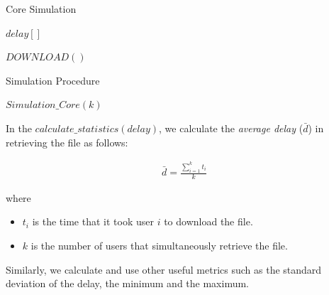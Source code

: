 {{{\begin{algorithm}
\caption{Core Simulation}\label{alg:simulation}
\begin{algorithmic}[1]

    \State $delay[]$
    \EndFunction
    
        \State {} $DOWNLOAD()$
    \EndFor
    \State {}
    \EndFunction
    \end{algorithmic}
\end{algorithm}

\begin{algorithm}
\caption{Simulation Procedure}\label{alg:simulationFull}
\begin{algorithmic}[1]

        \State $Simulation\_Core(k)$
    \EndFor
\end{algorithmic}
\end{algorithm}

In the $calculate\_statistics(delay)$, we calculate the \textit{average delay} ($\bar{d}$) in retrieving the file as follows:

\begin{align*}
\bar{d} = \frac{\sum_{i=1}^{k}{t_i}}{k}
\end{align*}

where 

\begin{itemize}
\item $t_i$ is the time that it took user $i$ to download the file.
\item $k$ is the number of users that simultaneously retrieve the file.
\end{itemize}

Similarly, we calculate and use other useful metrics such as the standard deviation of the delay, the minimum and the maximum. 

}}}
